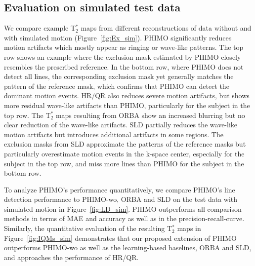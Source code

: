\documentclass[AMA,STIX2COL]{MRM}
\newcommand{\tstar}[1]{{T$_2^*$}}
\begin{document}
\subsection{Evaluation on simulated test data}  \label{sec:results:simulated}
We compare example \tstar{} maps from different reconstructions of data without and with simulated motion (Figure~\ref{fig:Ex_sim}). PHIMO significantly reduces motion artifacts which mostly appear as ringing or wave-like patterns. The top row shows an example where the exclusion mask estimated by PHIMO closely resembles the prescribed reference. In the bottom row, where PHIMO does not detect all lines, the corresponding exclusion mask yet generally matches the pattern of the reference mask, which confirms that PHIMO can detect the dominant motion events. 
HR/QR also reduces severe motion artifacts, but shows more residual wave-like artifacts than PHIMO, particularly for the subject in the top row. The \tstar{} maps resulting from ORBA show an increased blurring but no clear reduction of the wave-like artifacts. SLD partially reduces the wave-like motion artifacts but introduces additional artifacts in some regions. The exclusion masks from SLD approximate the patterns of the reference masks but particularly overestimate motion events in the k-space center, especially for the subject in the top row, and miss more lines than PHIMO for the subject in the bottom row.
 
To analyze PHIMO's performance quantitatively, we compare PHIMO's line detection performance to PHIMO-wo, ORBA and SLD on the test data with simulated motion in Figure~\ref{fig:LD_sim}. PHIMO outperforms all comparison methods in terms of MAE and accuracy as well as in the precision-recall-curve.
%
Similarly, the quantitative evaluation of the resulting \tstar{} maps in Figure~\ref{fig:IQMs_sim} demonstrates that our proposed extension of PHIMO outperforms PHIMO-wo as well as the learning-based baselines, ORBA and SLD, and approaches the performance of HR/QR.


\end{document}
